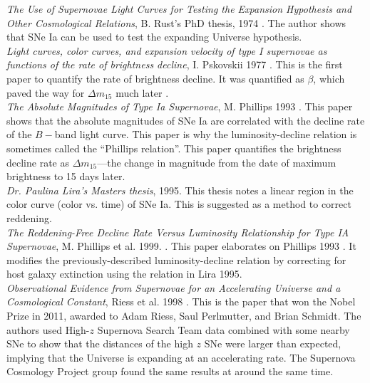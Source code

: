 \textit{The Use of Supernovae Light Curves for Testing the Expansion Hypothesis and Other Cosmological Relations}, B. Rust's PhD thesis, 1974 \cite{Rust1974}. The author shows that SNe Ia can be used to test the expanding Universe hypothesis.\\

\noindent\textit{Light curves, color curves, and expansion velocity of type I supernovae as functions of the rate of brightness decline}, I. Pskovskii 1977 \cite{Pskovskii1977}. This is the first paper to quantify the rate of brightness decline. It was quantified as $\beta$, which paved the way for $\Delta m_{15}$ much later \cite{Phillips1993}. \\

\noindent\textit{The Absolute Magnitudes of Type Ia Supernovae}, M. Phillips 1993 \cite{Phillips1993}. This paper shows that the absolute magnitudes of SNe Ia are correlated with the decline rate of the $B-$band light curve. This paper is why the luminosity-decline relation is sometimes called the ``Phillips relation''. This paper quantifies the brightness decline rate as $\Delta m_{15}$---the change in magnitude from the date of maximum brightness to 15 days later.\\

\noindent\textit{Dr. Paulina Lira's Masters thesis}, 1995. This thesis notes a linear region in the color curve (color vs. time) of SNe Ia. This is suggested as a method to correct reddening. \\

\noindent\textit{The Reddening-Free Decline Rate Versus Luminosity Relationship for Type IA Supernovae}, M. Phillips et al. 1999. \cite{Phillips1999}. This paper elaborates on Phillips 1993 \cite{Phillips1993}. It modifies the previously-described luminosity-decline relation by correcting for host galaxy extinction using the relation in Lira 1995.\\

\noindent\textit{Observational Evidence from Supernovae for an Accelerating Universe and a Cosmological Constant}, Riess et al. 1998 \cite{Riess1998}. This is the paper that won the Nobel Prize in 2011, awarded to Adam Riess, Saul Perlmutter, and Brian Schmidt. The authors used High-$z$ Supernova Search Team data combined with some nearby SNe to show that the distances of the high $z$ SNe were larger than expected, implying that the Universe is expanding at an accelerating rate. The Supernova Cosmology Project group found the same results at around the same time.\\